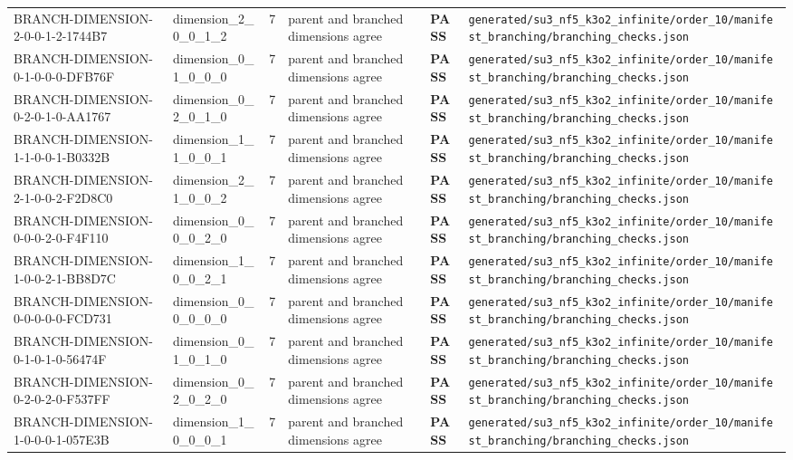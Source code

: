 \documentclass[11pt]{article}
\newcommand{\Pass}{\textcolor{green!50!black}{\textbf{PASS}}}
\newcommand{\RawPath}[1]{\texttt{#1}}
\begin{document}
\begin{longtable}{p{3cm}p{2.5cm}r p{3cm}l p{2cm}}
BRANCH-DIMENSION-2-0-0-1-2-1744B7 & dimension\_2\_0\_0\_1\_2 & 7 & parent and branched dimensions agree & \Pass & \RawPath{generated/su3\_nf5\_k3o2\_infinite/order\_10/manifest\_branching/branching\_checks.json}\\
BRANCH-DIMENSION-0-1-0-0-0-DFB76F & dimension\_0\_1\_0\_0\_0 & 7 & parent and branched dimensions agree & \Pass & \RawPath{generated/su3\_nf5\_k3o2\_infinite/order\_10/manifest\_branching/branching\_checks.json}\\
BRANCH-DIMENSION-0-2-0-1-0-AA1767 & dimension\_0\_2\_0\_1\_0 & 7 & parent and branched dimensions agree & \Pass & \RawPath{generated/su3\_nf5\_k3o2\_infinite/order\_10/manifest\_branching/branching\_checks.json}\\
BRANCH-DIMENSION-1-1-0-0-1-B0332B & dimension\_1\_1\_0\_0\_1 & 7 & parent and branched dimensions agree & \Pass & \RawPath{generated/su3\_nf5\_k3o2\_infinite/order\_10/manifest\_branching/branching\_checks.json}\\
BRANCH-DIMENSION-2-1-0-0-2-F2D8C0 & dimension\_2\_1\_0\_0\_2 & 7 & parent and branched dimensions agree & \Pass & \RawPath{generated/su3\_nf5\_k3o2\_infinite/order\_10/manifest\_branching/branching\_checks.json}\\
BRANCH-DIMENSION-0-0-0-2-0-F4F110 & dimension\_0\_0\_0\_2\_0 & 7 & parent and branched dimensions agree & \Pass & \RawPath{generated/su3\_nf5\_k3o2\_infinite/order\_10/manifest\_branching/branching\_checks.json}\\
BRANCH-DIMENSION-1-0-0-2-1-BB8D7C & dimension\_1\_0\_0\_2\_1 & 7 & parent and branched dimensions agree & \Pass & \RawPath{generated/su3\_nf5\_k3o2\_infinite/order\_10/manifest\_branching/branching\_checks.json}\\
BRANCH-DIMENSION-0-0-0-0-0-FCD731 & dimension\_0\_0\_0\_0\_0 & 7 & parent and branched dimensions agree & \Pass & \RawPath{generated/su3\_nf5\_k3o2\_infinite/order\_10/manifest\_branching/branching\_checks.json}\\
BRANCH-DIMENSION-0-1-0-1-0-56474F & dimension\_0\_1\_0\_1\_0 & 7 & parent and branched dimensions agree & \Pass & \RawPath{generated/su3\_nf5\_k3o2\_infinite/order\_10/manifest\_branching/branching\_checks.json}\\
BRANCH-DIMENSION-0-2-0-2-0-F537FF & dimension\_0\_2\_0\_2\_0 & 7 & parent and branched dimensions agree & \Pass & \RawPath{generated/su3\_nf5\_k3o2\_infinite/order\_10/manifest\_branching/branching\_checks.json}\\
BRANCH-DIMENSION-1-0-0-0-1-057E3B & dimension\_1\_0\_0\_0\_1 & 7 & parent and branched dimensions agree & \Pass & \RawPath{generated/su3\_nf5\_k3o2\_infinite/order\_10/manifest\_branching/branching\_checks.json}\\

\end{longtable}
\end{document}
